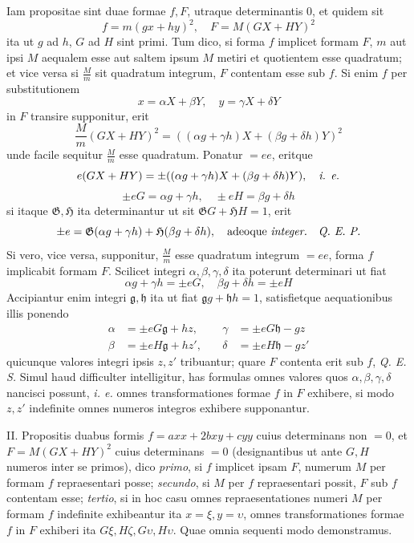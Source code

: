 Iam propositae sint duae formae $f,F$, utraque determinantis 0, et quidem sit
\[
f=m(gx+hy)^2,\quad F=M(GX+HY)^2
\]
ita ut $g$ ad $h$, $G$ ad $H$ sint primi. Tum dico, si forma $f$ implicet formam $F$, $m$ aut ipsi $M$ aequalem esse aut saltem ipsum $M$ metiri et quotientem esse quadratum; et vice versa si $\frac{M}{m}$ sit quadratum integrum, $F$ contentam esse sub $f$. Si enim $f$ per substitutionem
\[
x=\alpha X+\beta Y,\quad y=\gamma X+\delta Y
\]
in $F$ transire supponitur, erit
\[
\frac{M}{m}(GX+HY)^2=((\alpha g+\gamma h)X+(\beta g+\delta h)Y)^2
\]
unde facile sequitur $\frac{M}{m}$ esse quadratum. Ponatur $=ee$, eritque
\[
e(GX+HY)=\pm((\alpha g+\gamma h)X+(\beta g+\delta h)Y),\quad\text{\textit{i. e.}}
\]
\[
\pm eG=\alpha g+\gamma h,\quad\pm eH=\beta g+\delta h
\]
si itaque $\mathfrak{G},\mathfrak{H}$ ita determinantur ut sit $\mathfrak{G}G+\mathfrak{H}H=1$, erit
\[
\pm e=\mathfrak{G}(\alpha g+\gamma h)+\mathfrak{H}(\beta g+\delta h),\quad\text{adeoque \textit{integer.}\quad\textit{Q. E. P.}}
\]
Si vero, vice versa, supponitur, $\frac{M}{m}$ esse quadratum integrum $=ee$, forma $f$ implicabit formam $F$. Scilicet integri $\alpha,\beta,\gamma,\delta$ ita poterunt determinari ut fiat
\[
\alpha g+\gamma h=\pm eG,\quad \beta g+\delta h=\pm eH
\]
Accipiantur enim integri $\mathfrak{g},\mathfrak{h}$ ita ut fiat $\mathfrak{g}g+\mathfrak{h}h=1$, satisfietque aequationibus illis ponendo
\[
\begin{aligned}
\alpha&=\pm eG\mathfrak{g}+hz, &\quad\gamma&=\pm eG\mathfrak{h}-gz\\
\beta&=\pm eH\mathfrak{g}+hz', &\quad\delta&=\pm eH\mathfrak{h}-gz'
\end{aligned}
\]
quicunque valores integri ipsis $z,z'$ tribuantur; quare $F$ contenta erit sub $f$, \textit{Q. E. S.} Simul haud difficulter intelligitur, has formulas omnes valores quos $\alpha,\beta,\gamma,\delta$ nancisci possunt, \textit{i. e.} omnes transformationes formae $f$ in $F$ exhibere, si modo $z,z'$ indefinite omnes numeros integros exhibere supponantur.

II. Propositis duabus formis $f=axx+2bxy+cyy$ cuius determinans non $=0$, et $F=M(GX+HY)^2$ cuius determinans $=0$ (designantibus ut ante $G,H$ numeros inter se primos), dico \textit{primo}, si $f$ implicet ipsam $F$, numerum $M$ per formam $f$ repraesentari posse; \textit{secundo}, si $M$ per $f$ repraesentari possit, $F$ sub $f$ contentam esse; \textit{tertio}, si in hoc casu omnes repraesentationes numeri $M$ per formam $f$ indefinite exhibeantur ita $x=\xi,y=\upsilon$, omnes transformationes formae $f$ in $F$ exhiberi ita $G\xi,H\zeta,G\upsilon,H\upsilon$. Quae omnia sequenti modo demonstramus.


